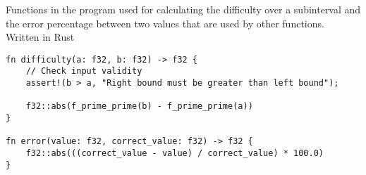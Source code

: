 \documentclass[../IA.tex]{subfiles}
\begin{document}
\begin{listing}[ht]
\centering
{}
\caption{Functions in the program used for calculating the difficulty over a subinterval and the error percentage between two values that are used by other functions. Written in Rust}
\label{lst:rust_helpers}
\begin{verbatim}
fn difficulty(a: f32, b: f32) -> f32 {
    // Check input validity
    assert!(b > a, "Right bound must be greater than left bound");

    f32::abs(f_prime_prime(b) - f_prime_prime(a))
}

fn error(value: f32, correct_value: f32) -> f32 {
    f32::abs(((correct_value - value) / correct_value) * 100.0)
}
\end{verbatim}
\end{listing}
\end{document}
